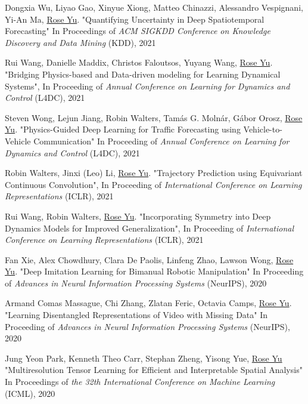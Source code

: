 \documentclass[margin,line]{res}
\begin{document}
\begin{resume}
\begin{enumerate}[label={[C\arabic*]}]
\item Dongxia Wu, Liyao Gao, Xinyue Xiong, Matteo Chinazzi, Alessandro Vespignani, Yi-An Ma, \underline{Rose Yu}.
"Quantifying Uncertainty in Deep Spatiotemporal Forecasting"
In Proceedings of \textit{ACM SIGKDD Conference on Knowledge Discovery and Data Mining} (KDD), 2021

\item  Rui Wang, Danielle Maddix, Christos Faloutsos, Yuyang Wang, \underline{Rose Yu}. "Bridging Physics-based and Data-driven modeling for Learning Dynamical Systems", In Proceeding of 
\textit{Annual Conference on Learning for Dynamics and Control}
 (L4DC), 2021 


\item Steven Wong, Lejun Jiang, Robin Walters, Tam{\'{a}}s G. Moln{\'{a}}r, G{\'{a}}bor Orosz,  \underline{Rose Yu}. "Physics-Guided Deep Learning for Traffic Forecasting using Vehicle-to-Vehicle Communication" In Proceeding of  
\textit{Annual Conference on Learning for Dynamics and Control}
 (L4DC), 2021 


\item  Robin Walters, Jinxi (Leo) Li, \underline{Rose Yu}. "Trajectory Prediction using Equivariant Continuous Convolution", In Proceeding of \textit{International Conference on Learning Representations} (ICLR), 2021

\item  Rui Wang, Robin Walters, \underline{Rose Yu}.  "Incorporating Symmetry into Deep Dynamics Models for Improved Generalization", In Proceeding of  \textit{International Conference on Learning Representations} (ICLR), 2021

\item Fan Xie,  Alex  Chowdhury, Clara De Paolis, Linfeng Zhao, Lawson Wong,  \underline{Rose Yu}.
"Deep Imitation Learning for Bimanual  Robotic Manipulation"
  In Proceeding of \textit{Advances in Neural Information Processing Systems} (NeurIPS), 2020
  
\item Armand Comas Massague, Chi Zhang, Zlatan Feric, Octavia Camps,  \underline{Rose Yu}.
"Learning Disentangled Representations of Video with Missing Data"
  In  Proceeding of \textit{Advances in Neural Information Processing Systems} (NeurIPS), 2020
 
      
\item Jung Yeon Park, Kenneth Theo Carr, Stephan Zheng, Yisong Yue, \underline{Rose Yu}
"Multiresolution Tensor Learning for Efficient and Interpretable Spatial Analysis"
 In Proceedings  of  \textit{the 32th International Conference on Machine Learning} (ICML), 2020
  

\end{enumerate}
\end{resume}
\end{document}

